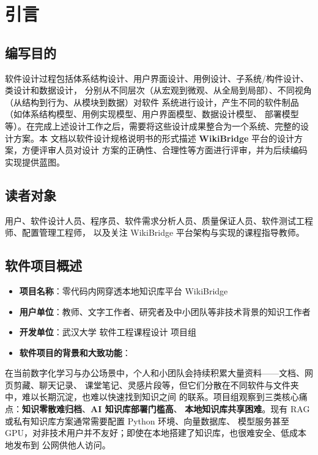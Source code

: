 \documentclass[UTF8,a4paper,12pt]{ctexart}
\newcommand{\keypoint}[1]{\textcolor{whu}{\textbf{#1}}}
\begin{document}

\section{引言}

\subsection{编写目的}
软件设计过程包括体系结构设计、用户界面设计、用例设计、子系统/构件设计、类设计和数据设计，
分别从不同层次（从宏观到微观、从全局到局部）、不同视角（从结构到行为、从模块到数据）对软件
系统进行设计，产生不同的软件制品（如体系结构模型、用例实现模型、用户界面模型、数据设计模型、
部署模型等）。在完成上述设计工作之后，需要将这些设计成果整合为一个系统、完整的设计方案。本
文档以软件设计规格说明书的形式描述 \keypoint{WikiBridge} 平台的设计方案，方便评审人员对设计
方案的正确性、合理性等方面进行评审，并为后续编码实现提供蓝图。

\subsection{读者对象}
用户、软件设计人员、程序员、软件需求分析人员、质量保证人员、软件测试工程师、配置管理工程师，
以及关注 WikiBridge 平台架构与实现的课程指导教师。

\subsection{软件项目概述}
\begin{itemize}[leftmargin=2.2em]
  \item \textbf{项目名称}：零代码内网穿透本地知识库平台 WikiBridge
  \item \textbf{用户单位}：教师、文字工作者、研究者及中小团队等非技术背景的知识工作者
  \item \textbf{开发单位}：武汉大学 软件工程课程设计 项目组
  \item \textbf{软件项目的背景和大致功能}：
\end{itemize}

在当前数字化学习与办公场景中，个人和小团队会持续积累大量资料——文档、网页剪藏、聊天记录、
课堂笔记、灵感片段等，但它们分散在不同软件与文件夹中，难以长期沉淀，也难以快速找到知识之间
的联系。项目组观察到三类核心痛点：\keypoint{知识零散难归档}、\keypoint{AI 知识库部署门槛高}、
\keypoint{本地知识库共享困难}。现有 RAG 或私有知识库方案通常需要配置 Python 环境、向量数据库、
模型服务甚至 GPU，对非技术用户并不友好；即使在本地搭建了知识库，也很难安全、低成本地发布到
公网供他人访问。
\end{document}
